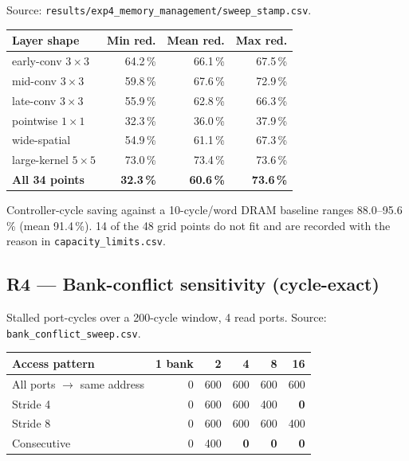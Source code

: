 \documentclass[11pt,a4paper]{article}
\newcommand{\file}[1]{\texttt{\small #1}}
\begin{document}
Source: \file{results/exp4\_memory\_management/sweep\_stamp.csv}.

\begin{center}
\small
\begin{tabular}{@{}lrrr@{}}
\toprule
\textbf{Layer shape} & \textbf{Min red.} & \textbf{Mean red.} & \textbf{Max red.} \\
\midrule
early-conv $3\times3$   & 64.2\,\% & 66.1\,\% & 67.5\,\% \\
mid-conv $3\times3$     & 59.8\,\% & 67.6\,\% & 72.9\,\% \\
late-conv $3\times3$    & 55.9\,\% & 62.8\,\% & 66.3\,\% \\
pointwise $1\times1$    & 32.3\,\% & 36.0\,\% & 37.9\,\% \\
wide-spatial            & 54.9\,\% & 61.1\,\% & 67.3\,\% \\
large-kernel $5\times5$ & 73.0\,\% & 73.4\,\% & 73.6\,\% \\
\midrule
\textbf{All 34 points}  & \textbf{32.3\,\%} & \textbf{60.6\,\%} & \textbf{73.6\,\%} \\
\bottomrule
\end{tabular}
\end{center}

\noindent Controller-cycle saving against a 10-cycle/word DRAM baseline ranges
88.0--95.6\,\% (mean 91.4\,\%). 14 of the 48 grid points do not fit and are
recorded with the reason in \file{capacity\_limits.csv}.

\subsection{R4 --- Bank-conflict sensitivity (cycle-exact)}

Stalled port-cycles over a 200-cycle window, 4 read ports. Source:
\file{bank\_conflict\_sweep.csv}.

\begin{center}
\small
\begin{tabular}{@{}lrrrrr@{}}
\toprule
\textbf{Access pattern} & \textbf{1 bank} & \textbf{2} & \textbf{4} & \textbf{8} & \textbf{16} \\
\midrule
All ports $\to$ same address & 0 & 600 & 600 & 600 & 600 \\
Stride 4                     & 0 & 600 & 600 & 400 & \textbf{0} \\
Stride 8                     & 0 & 600 & 600 & 600 & 400 \\
Consecutive                  & 0 & 400 & \textbf{0} & \textbf{0} & \textbf{0} \\
\bottomrule
\end{tabular}
\end{center}
\end{document}
